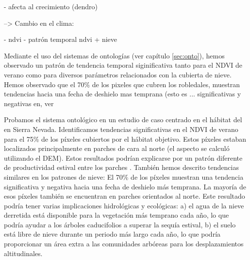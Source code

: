 - afecta al crecimiento (dendro)

--> Cambio en el clima: 




- ndvi 
- patrón temporal ndvi + nieve 

Mediante el uso del sistemas de ontologías (ver capítulo \ref{sec:onto}), hemos observado un patrón de tendencia temporal siginificativa tanto para el NDVI de verano como para diversos parámetros relacionados con la cubierta de nieve. Hemos observado que el 70\% de los pixeles que cubren los robledales, muestran tendencias hacia una fecha de deshielo mas temprana (esto es ... significativas y negativas en, ver 




Probamos el sistema ontológico en un estudio de caso centrado en el hábitat del \Qp en Sierra Nevada. Identificamos tendencias significativas en el NDVI de verano para el 75\% de los píxeles cubiertos por el hábitat objetivo. Estos píxeles estaban localizados principalmente en parches de cara al norte (el aspecto se calculó utilizando el DEM). Estos resultados podrían explicarse por un patrón diferente de productividad estival entre los parches \Qp. También hemos descrito tendencias similares en los patrones de nieve: El 70\% de los píxeles muestran una tendencia significativa y negativa hacia una fecha de deshielo más temprana. La mayoría de esos píxeles también se encuentran en parches orientados al norte. Este resultado podría tener varias implicaciones hidrológicas y ecológicas: a) el agua de la nieve derretida está disponible para la vegetación más temprano cada año, lo que podría ayudar a los árboles caducifolios a superar la sequía estival, b) el suelo está libre de nieve durante un periodo más largo cada año, lo que podría proporcionar un área extra a las comunidades arbóreas para los desplazamientos altitudinales.


